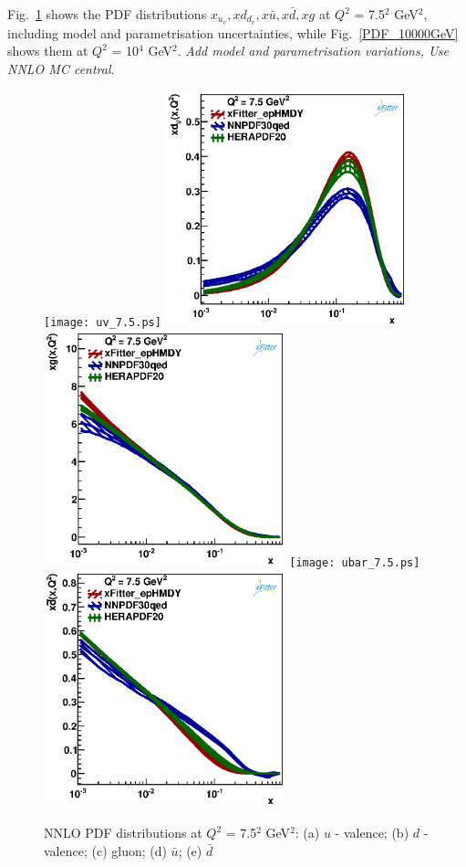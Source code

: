 Fig.~\ref{PDF_7.5GeV}
 shows the PDF distributions $x_{u_v},xd_{d_v},x\bar{u}, x\bar{d}, xg$ at $Q^{2}$ = 7.5$^{2}$ GeV$^{2}$,
including model and parametrisation uncertainties, while  Fig.~\ref{PDF_10000GeV} 
shows them at $Q^{2}$ = 10$^{4}$ GeV$^{2}$. {\it Add model and parametrisation variations, Use NNLO MC central}.
\begin{figure}
\texttt{[image: uv\_7.5.ps]} 
\includegraphics[width=7cm]{dv_7.5.ps} 
\includegraphics[width=7cm]{gluon_7.5.ps} 
\texttt{[image: ubar\_7.5.ps]} 
\includegraphics[width=7cm]{dbar_7.5.ps} 
\caption{NNLO PDF distributions at $Q^{2}$ = 7.5$^{2}$ GeV$^{2}$: (a) $u$ - valence; (b) $d$ - valence; (c) gluon; (d) $\bar{u}$; (e) $\bar{d}$ }
\label{PDF_7.5GeV}
\end{figure}
